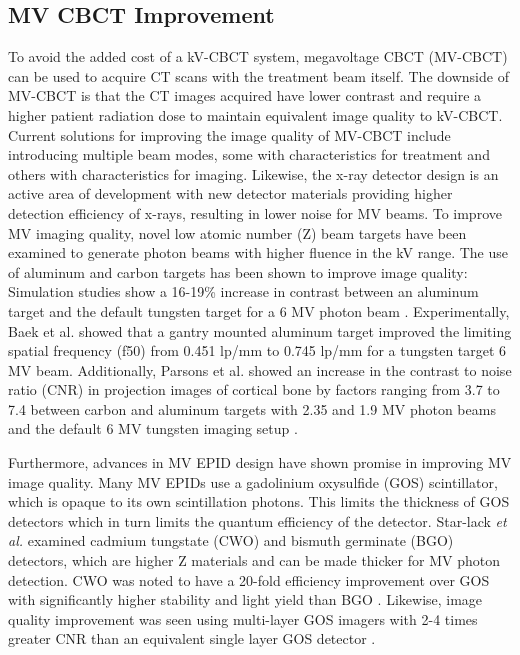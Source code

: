 \subsection{MV CBCT Improvement}

To avoid the added cost of a kV-CBCT system, megavoltage CBCT (MV-CBCT) can be used to acquire CT scans with the treatment beam itself\cite{Held2015FeasibilityCalculations,Malajovich2019CharacterizationDoses}. The downside of MV-CBCT is that the CT images acquired have lower contrast and require a higher patient radiation dose to maintain equivalent image quality to kV-CBCT\cite{Star-Lack2015AImaging}. Current solutions for improving the image quality of MV-CBCT include introducing multiple beam modes, some with characteristics for treatment and others with characteristics for imaging\cite{Parsons2012BeamTargets,Parsons2013PlanarLinear,Robar2012Volume-of-interestTarget}. Likewise, the x-ray detector design is an active area of development with new detector materials providing higher detection efficiency of x-rays, resulting in lower noise for MV beams\cite{Star-Lack2015AImaging,Myronakis2020Low-doseMLI,Myronakis2017AOptimization:}. 
To improve MV imaging quality, novel low atomic number (Z) beam targets have been examined to generate photon beams with higher fluence in the kV range. The use of aluminum and carbon targets has been shown to improve image quality: Simulation studies show a 16-19\% increase in contrast between an aluminum target and the default tungsten target for a 6 MV photon beam \cite{Kim2018InvestigationSimulation, Flampouri2002OptimizationExperiment}. Experimentally, Baek et al. showed that a gantry mounted aluminum target improved the limiting spatial frequency (f50) from 0.451 lp/mm to 0.745 lp/mm for a tungsten target  6 MV beam\cite{Baek2019AssessmentFilter}. Additionally, Parsons et al. showed an increase in the contrast to noise ratio (CNR) in projection images of cortical bone by factors ranging from 3.7 to 7.4 between carbon and aluminum targets with 2.35 and 1.9 MV photon beams and the default 6 MV tungsten imaging setup \cite{Parsons2012BeamTargets}.

Furthermore, advances in MV EPID design have shown promise in improving MV image quality. Many MV EPIDs use a gadolinium oxysulfide (GOS) scintillator, which is opaque to its own scintillation photons. This limits the thickness of GOS detectors which in turn limits the quantum efficiency of the detector. Star-lack \textit{et al.} examined cadmium tungstate (CWO) and bismuth germinate (BGO) detectors, which are higher Z materials and can be made thicker for MV photon detection. CWO was noted to have a 20-fold efficiency improvement over GOS with significantly higher stability and light yield than BGO \cite{Star-Lack2015AImaging}. Likewise, image quality improvement was seen using multi-layer GOS imagers with 2-4 times greater CNR than an equivalent single layer GOS detector \cite{Myronakis2020Low-doseMLI}.

